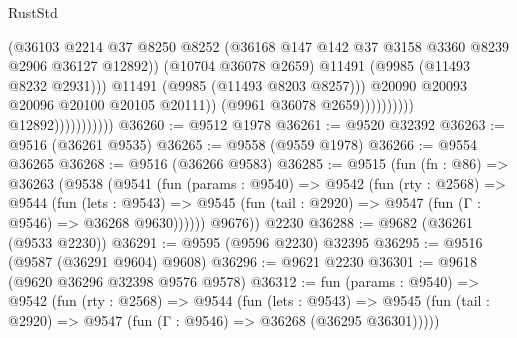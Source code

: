 \begin{lexlean}{RustStd}
\begin{coremodule}
                                                    (@36103
                                                      @2214
                                                      @37
                                                      @8250
                                                      @8252
                                                      (@36168
                                                        @147
                                                        @142
                                                        @37
                                                        @3158
                                                        @3360
                                                        @8239
                                                        @2906
                                                        @36127
                                                        @12892))
                                                    (@10704 @36078 @2659)
                                                    @11491
                                                    (@9985 (@11493 @8232 @2931)))
                                                  @11491
                                                  (@9985 (@11493 @8203 @8257)))
                                                @20090
                                                @20093
                                                @20096
                                                @20100
                                                @20105
                                                @20111))
                                            (@9961 @36078 @2659))))))))))
                          @12892)))))))))))
@36260 := @9512 @1978
@36261 := @9520 @32392
@36263 := @9516 (@36261 @9535)
@36265 := @9558 (@9559 @1978)
@36266 := @9554 @36265
@36268 := @9516 (@36266 @9583)
@36285 := @9515
    (fun (fn : @86) =>
    @36263
      (@9538
        (@9541
          (fun (params : @9540) =>
          @9542
            (fun (rty : @2568) =>
            @9544
              (fun (lets : @9543) =>
              @9545 (fun (tail : @2920) => @9547 (fun (Γ : @9546) => @36268 @9630))))))
        @9676))
    @2230
@36288 := @9682 (@36261 (@9533 @2230))
@36291 := @9595 (@9596 @2230) @32395
@36295 := @9516 (@9587 (@36291 @9604) @9608)
@36296 := @9621 @2230
@36301 := @9618 (@9620 @36296 @32398 @9576 @9578)
@36312 := fun (params : @9540) =>
  @9542
    (fun (rty : @2568) =>
    @9544
      (fun (lets : @9543) =>
      @9545 (fun (tail : @2920) => @9547 (fun (Γ : @9546) => @36268 (@36295 @36301)))))

\end{coremodule}
\end{lexlean}
